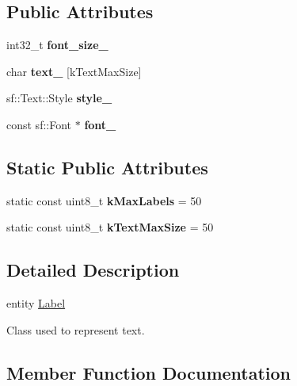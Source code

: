 \subsection*{Public Attributes}
\begin{DoxyCompactItemize}
\item 
\mbox{\label{class_label_a96bfd593e67f9031a244732fed63358f}} 
int32\+\_\+t {\bfseries font\+\_\+size\+\_\+}
\item 
\mbox{\label{class_label_a272e5426b0989b667b42cc4c87d697a7}} 
char {\bfseries text\+\_\+} \mbox{[}k\+Text\+Max\+Size\mbox{]}
\item 
\mbox{\label{class_label_a2f2da01fed83e50368d3d3674ed11d1b}} 
sf\+::\+Text\+::\+Style {\bfseries style\+\_\+}
\item 
\mbox{\label{class_label_a19110944dc9f96e238ca9e807d06421c}} 
const sf\+::\+Font $\ast$ {\bfseries font\+\_\+}
\end{DoxyCompactItemize}
\subsection*{Static Public Attributes}
\begin{DoxyCompactItemize}
\item 
\mbox{\label{class_label_a00ba8c3c345de6f169c739243aad2634}} 
static const uint8\+\_\+t {\bfseries k\+Max\+Labels} = 50
\item 
\mbox{\label{class_label_a73c9a955b95b4e3dfbba8b4a7771d64a}} 
static const uint8\+\_\+t {\bfseries k\+Text\+Max\+Size} = 50
\end{DoxyCompactItemize}


\subsection{Detailed Description}
entity \hyperlink{class_label}{Label}

Class used to represent text. 

\subsection{Member Function Documentation}
\mbox{\label{class_label_ad79f141fe2f04fd095b9507cac2667a6}} 
